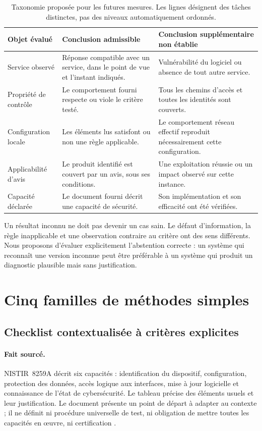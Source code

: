 \documentclass[11pt,a4paper]{article}
\begin{document}
\begin{table}[htbp]
\centering\small
\begin{tabularx}{\linewidth}{p{30mm}YY}
\toprule
Objet évalué & Conclusion admissible & Conclusion supplémentaire non établie\\
\midrule
Service observé & Réponse compatible avec un service, dans le point de vue et l'instant indiqués. & Vulnérabilité du logiciel ou absence de tout autre service.\\
Propriété de contrôle & Le comportement fourni respecte ou viole le critère testé. & Tous les chemins d'accès et toutes les identités sont couverts.\\
Configuration locale & Les éléments lus satisfont ou non une règle applicable. & Le comportement réseau effectif reproduit nécessairement cette configuration.\\
Applicabilité d'avis & Le produit identifié est couvert par un avis, sous ses conditions. & Une exploitation réussie ou un impact observé sur cette instance.\\
Capacité déclarée & Le document fourni décrit une capacité de sécurité. & Son implémentation et son efficacité ont été vérifiées.\\
\bottomrule
\end{tabularx}
\caption{Taxonomie proposée pour les futures mesures. Les lignes désignent des tâches distinctes, pas des niveaux automatiquement ordonnés.}\label{tab:sorties}
\end{table}

Un résultat inconnu ne doit pas devenir un cas sain. Le défaut d'information, la règle inapplicable et une observation contraire au critère ont des sens différents. Nous proposons d'évaluer explicitement l'abstention correcte : un système qui reconnaît une version inconnue peut être préférable à un système qui produit un diagnostic plausible mais sans justification.

\section{Cinq familles de méthodes simples}
\subsection{Checklist contextualisée à critères explicites}
\paragraph{Fait sourcé.}
NISTIR~8259A décrit six capacités : identification du dispositif, configuration, protection des données, accès logique aux interfaces, mise à jour logicielle et connaissance de l'état de cybersécurité. Le tableau précise des éléments usuels et leur justification. Le document présente un point de départ à adapter au contexte ; il ne définit ni procédure universelle de test, ni obligation de mettre toutes les capacités en œuvre, ni certification \cite{nist8259}.
\end{document}
